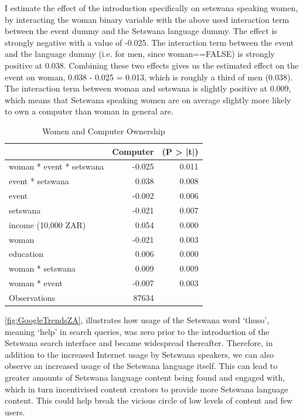 \documentclass[a4paper,british]{article}\usepackage[]{graphicx}\usepackage[]{xcolor}
\providecommand{\tabularnewline}{\\}
\let\ref\autoref
\begin{document}
I estimate the effect of the introduction specifically on setswana
speaking women, by interacting the woman binary variable with the
above used interaction term between the event dummy and the Setswana
language dummy. The effect is strongly negative with a value of -0.025.
The interaction term between the event and the language dummy (i.e.
for men, since woman==FALSE) is strongly positive at 0.038. Combining
these two effects gives us the estimated effect on the event on woman,
0.038 - 0.025 = 0.013, which is roughly a third of men (0.038). The
interaction term between woman and setswana is slightly positive at
0.009, which means that Setswana speaking women are on average slightly
more likely to own a computer than woman in general are.

\begin{table}[H]

\caption{Women and Computer Ownership}

\begin{centering}
\begin{tabular}{|l|r|r|}
\hline 
 &
Computer &
(P > |t|)\tabularnewline
\hline 
\hline 
woman {*} event {*} setswana &
-0.025 &
0.011\tabularnewline
\hline 
event {*} setswana &
0.038 &
0.008\tabularnewline
\hline 
event &
-0.002 &
0.006\tabularnewline
\hline 
setswana &
-0.021 &
0.007\tabularnewline
\hline 
income (10,000 ZAR) &
0.054 &
0.000\tabularnewline
\hline 
woman &
-0.021 &
0.003\tabularnewline
\hline 
education &
0.006 &
0.000\tabularnewline
\hline 
woman {*} setswana &
0.009 &
0.009\tabularnewline
\hline 
woman {*} event &
-0.007 &
0.003\tabularnewline
\hline 
Observations &
87634 &
\tabularnewline
\hline 
\end{tabular}
\par\end{centering}
\end{table}

\ref{fig:GoogleTrendsZA}, illustrates how usage of the Setswana word
`thuso', meaning `help' in search queries, was zero prior to the introduction
of the Setswana search interface and became widespread thereafter.
Therefore, in addition to the increased Internet usage by Setswana
speakers, we can also observe an increased usage of the Setswana language
itself. This can lead to greater amounts of Setswana language content
being found and engaged with, which in turn incentivised content creators
to provide more Setswana language content. This could help break the
vicious circle of low levels of content and few users.
\end{document}
